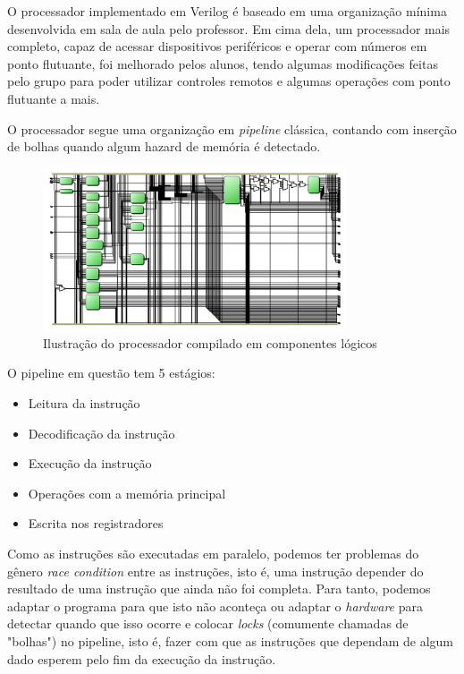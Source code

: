 \documentclass[12pt, a4paper, twocolumn]{article}
\begin{document}
O processador implementado em Verilog é baseado em uma organização mínima desenvolvida em sala de aula pelo professor. Em cima dela, um processador mais completo, capaz de acessar dispositivos periféricos e operar com números em ponto flutuante, foi melhorado pelos alunos, tendo algumas modificações feitas pelo grupo para poder utilizar controles remotos e algumas operações com ponto flutuante a mais.

O processador segue uma organização em \textit{pipeline} clássica, contando com inserção de bolhas quando algum hazard de memória é detectado.

\begin{figure}[h!]
    \centering
    \includegraphics[width=0.8\textwidth]{data_pipeline.png}
    \caption{Ilustração do processador compilado em componentes lógicos}
\end{figure}

O pipeline em questão tem 5 estágios:

\begin{itemize}
    \item Leitura da instrução
    \item Decodificação da instrução
    \item Execução da instrução
    \item Operações com a memória principal
    \item Escrita nos registradores
\end{itemize}

Como as instruções são executadas em paralelo, podemos ter problemas do gênero \textit{race condition} entre as instruções, isto é, uma instrução depender do resultado de uma instrução que ainda não foi completa. Para tanto, podemos adaptar o programa para que isto não aconteça ou adaptar o \textit{hardware} para detectar quando que isso ocorre e colocar \textit{locks} (comumente chamadas de "bolhas") no pipeline, isto é, fazer com que as instruções que dependam de algum dado esperem pelo fim da execução da instrução. 
\end{document}
